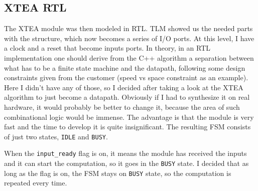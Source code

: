\documentclass[]{IEEEtran}
\begin{document}
\subsection{XTEA RTL}
The XTEA module was then modeled in RTL. TLM showed us the needed parts with the structure, which now becomes a series of I/O ports.
At this level, I have a clock and a reset that become inputs ports.
In theory, in an RTL implementation one should derive from the C++ algorithm a separation between what has to be a finite state
machine and the datapath, following some design constraints given from the customer (speed vs space constraint as an example).
Here I didn't have any of those, so I decided after taking a look at the XTEA algorithm to just become a datapath.
Obviously if I had to synthesize it on real hardware, it would probably be better to change it, because the area of such
combinational logic would be immense.
The advantage is that the module is very fast and the time to develop it is quite insignificant.
The resulting FSM consists of just two states, \texttt{IDLE} and \texttt{BUSY}.
\begin{center}
\end{center}
When the \texttt{input\_ready} flag is on, it means the module has received the inputs and it can start the computation, so it goes in the \texttt{BUSY}
state. I decided that as long as the flag is on, the FSM stays on \texttt{BUSY} state, so the computation is repeated every time.
\end{document}
